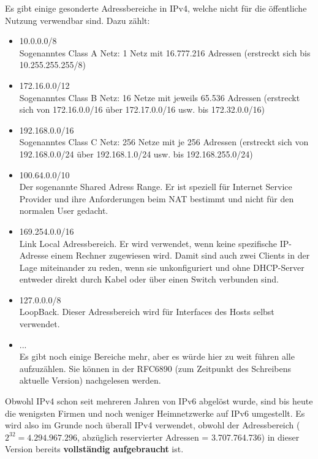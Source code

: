 \documentclass[12pt,a4paper]{report}
\begin{document}
Es gibt einige gesonderte Adressbereiche in IPv4, welche nicht für die öffentliche Nutzung verwendbar sind. Dazu zählt:
\begin{itemize}
\item 10.0.0.0/8\\
Sogenanntes Class A Netz: 1 Netz mit 16.777.216 Adressen (erstreckt sich bis 10.255.255.255/8)
\item 172.16.0.0/12\\
Sogenanntes Class B Netz: 16 Netze mit jeweils 65.536 Adressen (erstreckt sich von 172.16.0.0/16 über 172.17.0.0/16 usw. bis 172.32.0.0/16)
\item 192.168.0.0/16\\
Sogenanntes Class C Netz: 256 Netze mit je 256 Adressen (erstreckt sich von 192.168.0.0/24 über 192.168.1.0/24 usw. bis 192.168.255.0/24)
\item 100.64.0.0/10\\
Der sogenannte Shared Adress Range. Er ist speziell für Internet Service Provider und ihre Anforderungen beim NAT bestimmt und nicht für den normalen User gedacht.
\item 169.254.0.0/16\\
Link Local Adressbereich. Er wird verwendet, wenn keine spezifische IP-Adresse einem Rechner zugewiesen wird. Damit sind auch zwei Clients in der Lage miteinander zu reden, wenn sie unkonfiguriert und ohne DHCP-Server entweder direkt durch Kabel oder über einen Switch verbunden sind.
\item 127.0.0.0/8\\
LoopBack. Dieser Adressbereich wird für Interfaces des Hosts selbst verwendet. 
\item ...\\
Es gibt noch einige Bereiche mehr, aber es würde hier zu weit führen alle aufzuzählen. Sie können in der RFC6890 (zum Zeitpunkt des Schreibens aktuelle Version) nachgelesen werden.
\end{itemize}

Obwohl IPv4 schon seit mehreren Jahren von IPv6 abgelöst wurde, sind bis heute die wenigsten Firmen und noch weniger Heimnetzwerke auf IPv6 umgestellt. Es wird also im Grunde noch überall IPv4 verwendet, obwohl der Adressbereich ($2^{32} = 4.294.967.296$, abzüglich reservierter Adressen = 3.707.764.736) in dieser Version bereits \textbf{vollständig aufgebraucht} ist.\\
\end{document}
